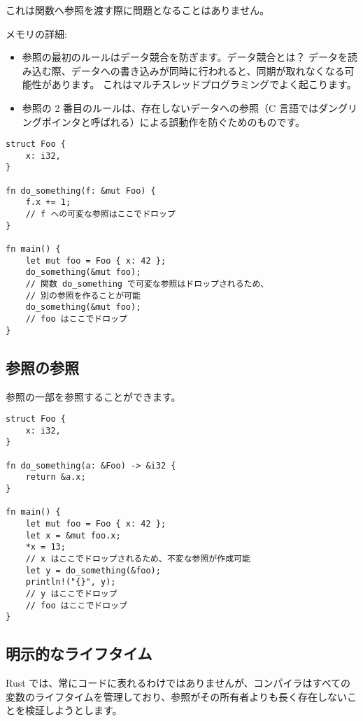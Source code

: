 これは関数へ参照を渡す際に問題となることはありません。

メモリの詳細:

\begin{itemize}
\item
  参照の最初のルールはデータ競合を防ぎます。データ競合とは？
  データを読み込む際、データへの書き込みが同時に行われると、同期が取れなくなる可能性があります。
  これはマルチスレッドプログラミングでよく起こります。
\item
  参照の 2 番目のルールは、存在しないデータへの参照（C
  言語ではダングリングポインタと呼ばれる）による誤動作を防ぐためのものです。
\end{itemize}

\begin{verbatim}
struct Foo {
    x: i32,
}

fn do_something(f: &mut Foo) {
    f.x += 1;
    // f への可変な参照はここでドロップ
}

fn main() {
    let mut foo = Foo { x: 42 };
    do_something(&mut foo);
    // 関数 do_something で可変な参照はドロップされるため、
    // 別の参照を作ることが可能
    do_something(&mut foo);
    // foo はここでドロップ
}
\end{verbatim}

\subsection{参照の参照}

参照の一部を参照することができます。

\begin{verbatim}
struct Foo {
    x: i32,
}

fn do_something(a: &Foo) -> &i32 {
    return &a.x;
}

fn main() {
    let mut foo = Foo { x: 42 };
    let x = &mut foo.x;
    *x = 13;
    // x はここでドロップされるため、不変な参照が作成可能
    let y = do_something(&foo);
    println!("{}", y);
    // y はここでドロップ
    // foo はここでドロップ
}
\end{verbatim}

\subsection{明示的なライフタイム}

Rust
では、常にコードに表れるわけではありませんが、コンパイラはすべての変数のライフタイムを管理しており、参照がその所有者よりも長く存在しないことを検証しようとします。

